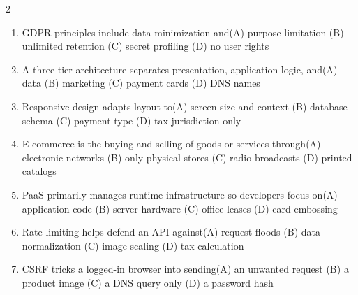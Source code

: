 \documentclass[a4paper]{article}
\begin{document}
\begin{multicols*}{2}
\begin{enumerate}[resume]
\item GDPR principles include data minimization and\newline\hspace*{0.6em}(A) purpose limitation \quad (B) unlimited retention \newline\hspace*{0.6em}(C) secret profiling \quad (D) no user rights
\item A three-tier architecture separates presentation, application logic, and\newline\hspace*{0.6em}(A) data \quad (B) marketing \newline\hspace*{0.6em}(C) payment cards \quad (D) DNS names
\item Responsive design adapts layout to\newline\hspace*{0.6em}(A) screen size and context \quad (B) database schema \newline\hspace*{0.6em}(C) payment type \quad (D) tax jurisdiction only
\item E-commerce is the buying and selling of goods or services through\newline\hspace*{0.6em}(A) electronic networks \quad (B) only physical stores \newline\hspace*{0.6em}(C) radio broadcasts \quad (D) printed catalogs
\item PaaS primarily manages runtime infrastructure so developers focus on\newline\hspace*{0.6em}(A) application code \quad (B) server hardware \newline\hspace*{0.6em}(C) office leases \quad (D) card embossing
\item Rate limiting helps defend an API against\newline\hspace*{0.6em}(A) request floods \quad (B) data normalization \newline\hspace*{0.6em}(C) image scaling \quad (D) tax calculation
\item CSRF tricks a logged-in browser into sending\newline\hspace*{0.6em}(A) an unwanted request \quad (B) a product image \newline\hspace*{0.6em}(C) a DNS query only \quad (D) a password hash

\end{enumerate}
\end{multicols*}
\end{document}
